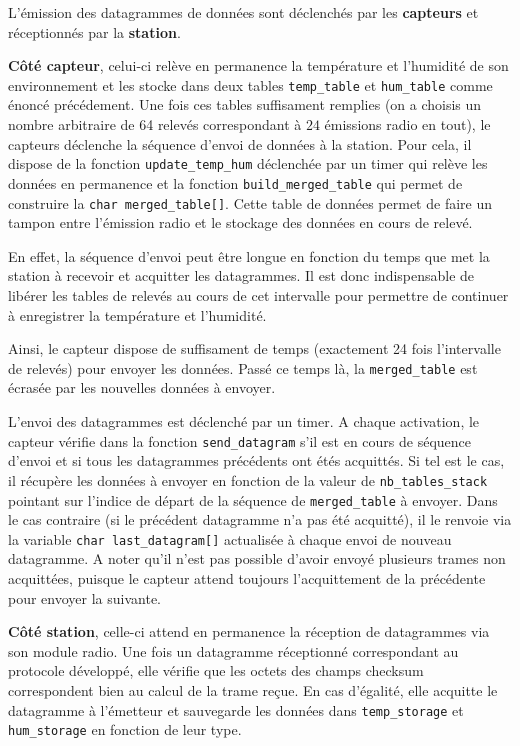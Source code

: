\documentclass[a4paper]{article}
\begin{document}
L'émission des datagrammes de données sont déclenchés par les \textbf{capteurs} et réceptionnés par la \textbf{station}. 

\vspace{0.3cm}

\textbf{Côté capteur}, celui-ci relève en permanence la température et l'humidité de son environnement et les stocke dans deux tables 
\texttt{temp\_table} et \texttt{hum\_table} comme énoncé précédement. 
Une fois ces tables suffisament remplies (on a choisis un nombre arbitraire de 64 relevés correspondant à $24$ émissions radio en tout), 
le capteurs déclenche la séquence d'envoi de données à la station. 
Pour cela, il dispose de la fonction \texttt{update\_temp\_hum} déclenchée par un timer qui relève les données 
en permanence et la fonction \texttt{build\_merged\_table} qui permet de construire la \texttt{char merged\_table[]}. 
Cette table de données permet de faire un tampon entre l'émission radio et le stockage des données en cours de relevé. 

En effet, la séquence d'envoi peut être longue en fonction du temps que met la station à recevoir et acquitter les datagrammes. 
Il est donc indispensable de libérer les tables de relevés au cours de cet intervalle pour permettre de continuer 
à enregistrer la température et l'humidité. 

Ainsi, le capteur dispose de suffisament de temps (exactement 24 fois l'intervalle de relevés) pour envoyer les données. 
Passé ce temps là, la \texttt{merged\_table} est écrasée par les nouvelles données à envoyer. 

L'envoi des datagrammes est déclenché par un timer. A chaque activation, le capteur vérifie dans la fonction 
\texttt{send\_datagram} s'il est en cours de séquence d'envoi et si tous les datagrammes précédents ont étés acquittés. 
Si tel est le cas, il récupère les données à envoyer en fonction de la valeur de \texttt{nb\_tables\_stack} pointant sur 
l'indice de départ de la séquence de \texttt{merged\_table} à envoyer. 
Dans le cas contraire (si le précédent datagramme n'a pas été acquitté), il le renvoie via la variable \texttt{char last\_datagram[]}
actualisée à chaque envoi de nouveau datagramme. 
A noter qu'il n'est pas possible d'avoir envoyé plusieurs trames non acquittées, puisque le capteur attend toujours l'acquittement 
de la précédente pour envoyer la suivante. 

\vspace{0.3cm}

\textbf{Côté station}, celle-ci attend en permanence la réception de datagrammes via son module radio. 
Une fois un datagramme réceptionné correspondant au protocole développé, elle vérifie que les octets 
des champs checksum correspondent bien au calcul de la trame reçue. En cas d'égalité, elle acquitte le datagramme à l'émetteur et 
sauvegarde les données dans \texttt{temp\_storage} et \texttt{hum\_storage} en fonction de leur type. 
\end{document}
